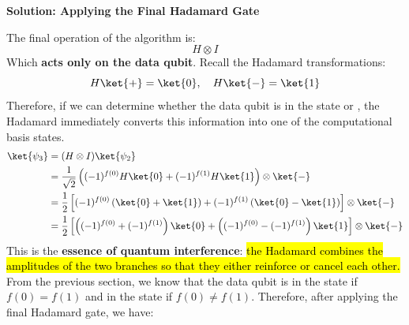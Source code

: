 \highspace
\begin{flushleft}
    \textcolor{Green3}{ \textbf{Solution: Applying the Final Hadamard Gate}}
\end{flushleft}
The final operation of the algorithm is:
\begin{equation*}
    H \otimes I
\end{equation*}
Which \textbf{acts only on the data qubit}. Recall the Hadamard transformations:
\begin{equation*}
    H\ket{+} = \ket{0}, \quad H\ket{-} = \ket{1}
\end{equation*}
Therefore, if we can determine whether the data qubit is in the state \ket{+} or \ket{-}, the Hadamard immediately converts this information into one of the computational basis states.
\begin{equation}
    \begin{aligned}
        \ket{\psi_3} &= (H \otimes I)\ket{\psi_2} \\
        &= \frac{1}{\sqrt{2}} \left( (-1)^{f(0)}H\ket{0} + (-1)^{f(1)}H\ket{1} \right) \otimes \ket{-} \\
        &= \frac{1}{2} \left[ (-1)^{f(0)} \left(\ket{0} + \ket{1}\right) + (-1)^{f(1)} \left(\ket{0} - \ket{1}\right) \right] \otimes \ket{-} \\
        &= \frac{1}{2} \left[ \left((-1)^{f(0)} + (-1)^{f(1)}\right)\ket{0} + \left((-1)^{f(0)} - (-1)^{f(1)}\right)\ket{1} \right] \otimes \ket{-}
    \end{aligned}
\end{equation}
This is the \textbf{essence of quantum interference}: \hl{the Hadamard combines the amplitudes of the two branches so that they either reinforce or cancel each other.} From the previous section, we know that the data qubit is in the state \ket{+} if $f(0) = f(1)$ and in the state \ket{-} if $f(0) \neq f(1)$. Therefore, after applying the final Hadamard gate, we have:
